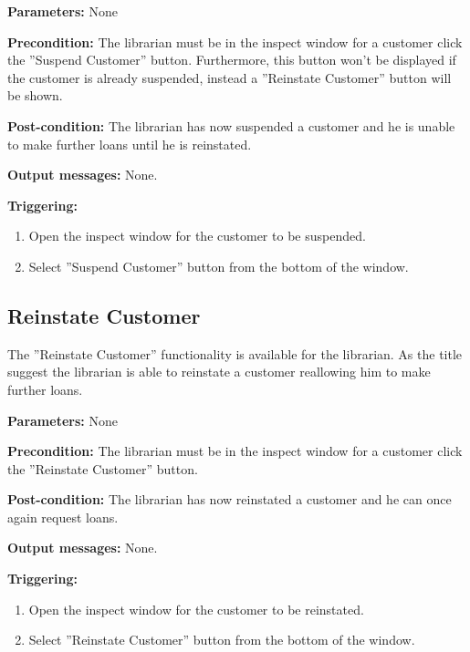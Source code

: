 \begin{description}

\item \textbf{Parameters:} None

\item \textbf{Precondition:} The librarian must be in the inspect window for a
customer click the ''Suspend Customer'' button. Furthermore, this button won't
be displayed if the customer is already suspended, instead a ''Reinstate
Customer'' button will be shown.

\item \textbf{Post-condition:} The librarian has now suspended a customer and he
is unable to make further loans until he is reinstated.

\item \textbf{Output messages:} None.

\item \textbf{Triggering:}
\begin{enumerate}
\item Open the inspect window for the customer to be suspended.
\item Select ''Suspend Customer'' button from the bottom of the window.
\end{enumerate}

\end{description}

\subsection{Reinstate Customer}

The ''Reinstate Customer'' functionality is available for the librarian. As the
title suggest the librarian is able to reinstate a customer reallowing him to
make further loans.

\begin{description}

\item \textbf{Parameters:} None

\item \textbf{Precondition:} The librarian must be in the inspect window for a
customer click the ''Reinstate Customer'' button.

\item \textbf{Post-condition:} The librarian has now reinstated a customer and
he can once again request loans.

\item \textbf{Output messages:} None.

\item \textbf{Triggering:}
\begin{enumerate}
\item Open the inspect window for the customer to be reinstated.
\item Select ''Reinstate Customer'' button from the bottom of the window.
\end{enumerate}

\end{description}

